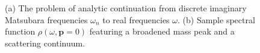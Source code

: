 \begin{figure}[b]
	\centering
	\caption[Analytic continuation and spectral function]{(a) The problem of analytic continuation from discrete imaginary Matsubara frequencies $\omega_n$ to real frequencies $\omega$. (b) Sample spectral function $\rho(\omega,\bm{p}=0)$ featuring a broadened mass peak and a scattering continuum.}
	\label{fig:spectral-properties}
\end{figure}